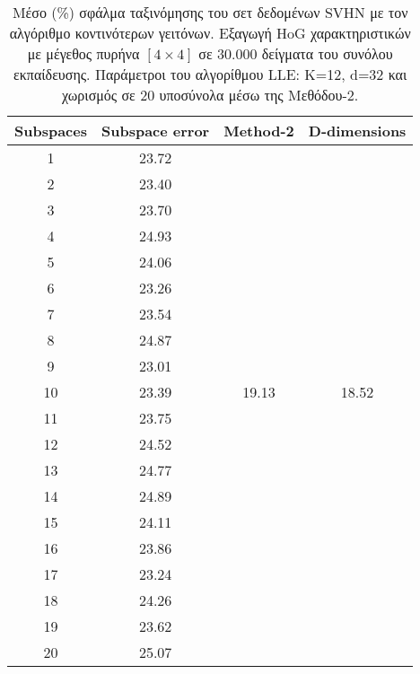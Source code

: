 \begin{table}[H]
\singlespacing
\centering
\label{tab:table18}
\caption{Μέσο (\%) σφάλμα ταξινόμησης του σετ δεδομένων \textlatin{SVHN} με τον αλγόριθμο κοντινότερων γειτόνων. Εξαγωγή \textlatin{HoG} χαρακτηριστικών με μέγεθος πυρήνα $[4\times4]$ σε 30.000 δείγματα του συνόλου εκπαίδευσης. Παράμετροι του αλγορίθμου \textlatin{LLE: K=12, d=32} και χωρισμός σε 20 υποσύνολα μέσω της Μεθόδου-2. }
\vspace*{5mm}
\begin{tabular}{|c|c|c|c|}
\hline
\textlatin{Subspaces} & \textlatin{Subspace error} & \textlatin{Method-2} & \textlatin{D-dimensions}  \\
\hline
1 & 23.72 & & \\
2 & 23.40 & & \\
3 & 23.70 & & \\
4 & 24.93 & & \\
5 & 24.06 & & \\
6 & 23.26 & & \\
7 & 23.54 &  & \\
8 & 24.87 & & \\
9 & 23.01 &  & \\
10 & 23.39 & 19.13 & 18.52 \\
11 & 23.75 & & \\
12 & 24.52 &  & \\
13 & 24.77 &  & \\
14 & 24.89 & & \\
15 & 24.11 & & \\
16 & 23.86 & & \\
17 & 23.24 &  & \\
18 & 24.26 & & \\
19 & 23.62 &  & \\
20 & 25.07 &  & \\
\hline
\end{tabular}
\end{table}

